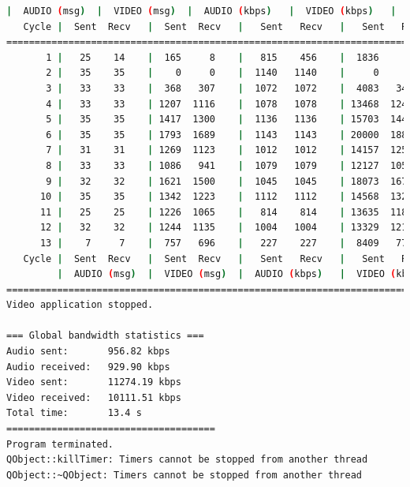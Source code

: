 \begin{lstlisting}[language=bash,basicstyle=\ttfamily\tiny]
         |  AUDIO (msg)  |  VIDEO (msg)  |  AUDIO (kbps)   |  VIDEO (kbps)   |     CPU (%) 
   Cycle |  Sent  Recv   |  Sent  Recv   |   Sent   Recv   |   Sent   Recv   | Program System
================================================================================================
       1 |   25    14    |  165     8    |   815    456    |  1836     89    |  33      0       
       2 |   35    35    |    0     0    |  1140   1140    |     0      0    |  36     74       
       3 |   33    33    |  368   307    |  1072   1072    |  4083   3405    |  35     73       
       4 |   33    33    | 1207  1116    |  1078   1078    | 13468  12452    |  33     72       
       5 |   35    35    | 1417  1300    |  1136   1136    | 15703  14407    |  35     71       
       6 |   35    35    | 1793  1689    |  1143   1143    | 20000  18843    |  35     72       
       7 |   31    31    | 1269  1123    |  1012   1012    | 14157  12527    |  39     70       
       8 |   33    33    | 1086   941    |  1079   1079    | 12127  10510    |  25     73       
       9 |   32    32    | 1621  1500    |  1045   1045    | 18073  16725    |  36     69       
      10 |   35    35    | 1342  1223    |  1112   1112    | 14568  13276    |  28     72       
      11 |   25    25    | 1226  1065    |   814    814    | 13635  11844    |  38     73       
      12 |   32    32    | 1244  1135    |  1004   1004    | 13329  12162    |  34     69       
      13 |    7     7    |  757   696    |   227    227    |  8409   7730    |  11     55       
   Cycle |  Sent  Recv   |  Sent  Recv   |   Sent   Recv   |   Sent   Recv   | Program System
         |  AUDIO (msg)  |  VIDEO (msg)  |  AUDIO (kbps)   |  VIDEO (kbps)   |     CPU (%) 
===========================================================================================
Video application stopped.

=== Global bandwidth statistics ===
Audio sent:       956.82 kbps
Audio received:   929.90 kbps
Video sent:       11274.19 kbps
Video received:   10111.51 kbps
Total time:       13.4 s
=====================================
Program terminated.
QObject::killTimer: Timers cannot be stopped from another thread
QObject::~QObject: Timers cannot be stopped from another thread
\end{lstlisting}
\vspace{\baselineskip}

